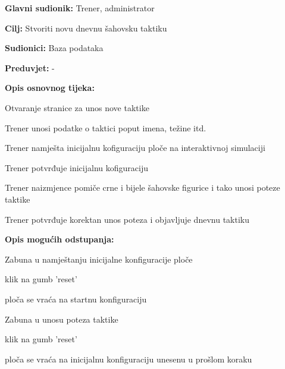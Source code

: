 					\noindent {}
					\begin{packed_item}
	
						\item \textbf{Glavni sudionik: }Trener, administrator
						\item  \textbf{Cilj: } Stvoriti novu dnevnu šahovsku taktiku
						\item  \textbf{Sudionici: } Baza podataka
						\item  \textbf{Preduvjet: } -
						\item  \textbf{Opis osnovnog tijeka:}
						
						\item[] \begin{packed_enum}
	
							\item Otvaranje stranice za unos nove taktike
							\item Trener unosi podatke o taktici poput imena, težine itd.
							\item Trener namješta inicijalnu kofiguraciju ploče na interaktivnoj simulaciji
							\item Trener potvrđuje inicijalnu kofiguraciju
							\item Trener naizmjence pomiče crne i bijele šahovske figurice i tako unosi poteze taktike
							\item Trener potvrđuje korektan unos poteza i objavljuje dnevnu taktiku
							
						\end{packed_enum}
						
						\item  \textbf{Opis mogućih odstupanja:}
						
						\item[] \begin{packed_item}
	
							\item[3.a] Zabuna u namještanju inicijalne konfiguracije ploče
							\item[] \begin{packed_enum}
								
								\item klik na gumb 'reset'
								\item ploča se vraća na startnu konfiguraciju
								
							\end{packed_enum}
							
							\item[5.a] Zabuna u unosu poteza taktike
							\item[] \begin{packed_enum}
								
								\item klik na gumb 'reset'
								\item ploča se vraća na inicijalnu konfiguraciju unesenu u prošlom koraku
								
							\end{packed_enum}
							
						\end{packed_item}
					\end{packed_item}
					

